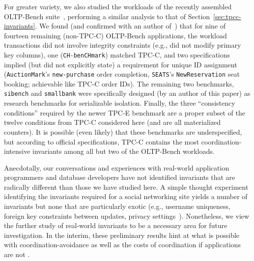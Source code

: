 For greater variety, we also studied the workloads of the recently
assembled OLTP-Bench suite~\cite{oltpbench}, performing a similar
analysis to that of Section~\ref{sec:tpcc-invariants}. We found (and
confirmed with an author of~\cite{oltpbench}) that for nine of
fourteen remaining (non-TPC-C) OLTP-Bench applications, the workload
transactions did not involve integrity constraints (e.g., did not
modify primary key columns), one (\texttt{CH-benCHmark}) matched
TPC-C, and two specifications implied (but did not explicitly state) a
requirement for unique ID assignment (\texttt{AuctionMark}'s
\texttt{new-purchase} order completion, \texttt{SEATS}'s
\texttt{NewReservation} seat booking; achievable like TPC-C order
IDs). The remaining two benchmarks, \texttt{sibench} and
\texttt{smallbank} were specifically designed (by an author of this
paper) as research benchmarks for serializable isolation. Finally, the
three ``consistency conditions'' required by the newer TPC-E benchmark
are a proper subset of the twelve conditions from TPC-C considered
here (and are all materialized counters). It is possible (even likely)
that these benchmarks are underspecified, but according to official
specifications, TPC-C contains the most coordination-intensive
invariants among all but two of the OLTP-Bench workloads.

Anecdotally, our conversations and experiences with real-world
application programmers and database developers have not identified
invariants that are radically different than those we have studied
here. A simple thought experiment identifying the invariants required
for a social networking site yields a number of invariants but none
that are particularly exotic (e.g., username uniqueness, foreign key
constraints between updates, privacy
settings~\cite{pnuts,ramp-txns}). Nonetheless, we view the further study of
real-world invariants to be a necessary area for future
investigation. In the interim, these preliminary results hint at what
is possible with coordination-avoidance as well as the costs of
coordination if applications are not \iconfluent.


